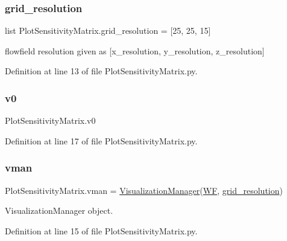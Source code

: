\subsubsection{\texorpdfstring{grid\+\_\+resolution}{grid\_resolution}}
{\footnotesize\ttfamily list Plot\+Sensitivity\+Matrix.\+grid\+\_\+resolution = \mbox{[}25, 25, 15\mbox{]}}



flowfield resolution given as \mbox{[}x\+\_\+resolution, y\+\_\+resolution, z\+\_\+resolution\mbox{]} 



Definition at line 13 of file Plot\+Sensitivity\+Matrix.\+py.

\mbox{\label{namespace_plot_sensitivity_matrix_a9c4c4d6959315c8f430d5e0b4b59945d}} 
\subsubsection{\texorpdfstring{v0}{v0}}
{\footnotesize\ttfamily Plot\+Sensitivity\+Matrix.\+v0}



Definition at line 17 of file Plot\+Sensitivity\+Matrix.\+py.

\mbox{\label{namespace_plot_sensitivity_matrix_a561c3184abc48dd7ca3ac05112482a82}} 
\subsubsection{\texorpdfstring{vman}{vman}}
{\footnotesize\ttfamily Plot\+Sensitivity\+Matrix.\+vman = \mbox{\hyperlink{classvisualization__manager___d_j_1_1_visualization_manager}{Visualization\+Manager}}(\mbox{\hyperlink{namespace_plot_sensitivity_matrix_ab3a981e10a7fb62fd0803b775cfc9c6e}{WF}}, \mbox{\hyperlink{namespace_plot_sensitivity_matrix_acceedf9e01ea99cebd60321cfe5f1563}{grid\+\_\+resolution}})}



Visualization\+Manager object. 



Definition at line 15 of file Plot\+Sensitivity\+Matrix.\+py.

